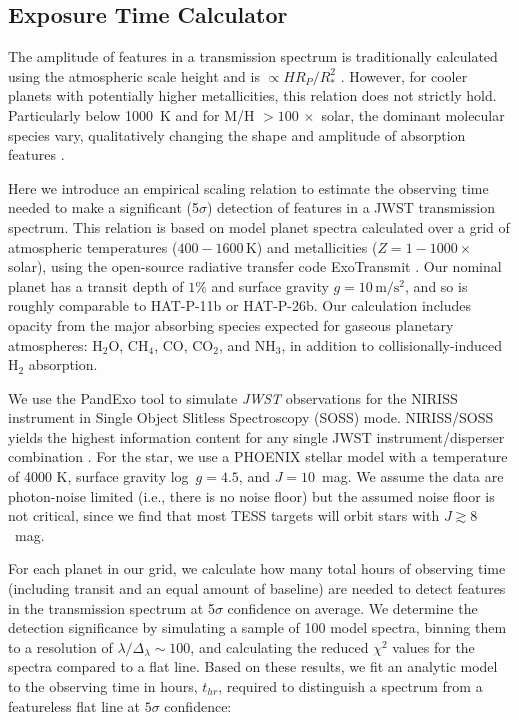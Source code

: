 \documentclass[twocolumn]{aastex61}
\begin{document}
\subsection{Exposure Time Calculator}
The amplitude of features in a transmission spectrum is traditionally calculated using the atmospheric scale height and is $\propto H R_P/R_*^2$ \citep{miller-ricci:2009}. However, for cooler planets with potentially higher metallicities, this relation does not strictly hold. Particularly below 1000~K and for M/H  $>100\,\times$ solar, the dominant molecular species vary,  qualitatively changing the shape and amplitude of absorption features \citep{moses:2013}.

Here we introduce an empirical scaling relation to estimate the
observing time needed to make a significant (5$\sigma$) detection of
features in a JWST transmission spectrum. This relation is based on
model planet spectra calculated over a grid of atmospheric
temperatures ($400 - 1600\,\mathrm{K}$) and metallicities ($Z = 1 -
1000\times$ solar), using the open-source radiative transfer code
ExoTransmit \citep{kempton:2016}.  Our nominal planet has a transit
depth of $1\%$ and surface gravity $g = 10\,\mathrm{m/s^2}$, and so is
roughly comparable to HAT-P-11b or HAT-P-26b. Our calculation includes
opacity from the major absorbing species expected for gaseous
planetary atmospheres: H$_2$O, CH$_4$, CO, CO$_2$, and NH$_3$, in
addition to collisionally-induced H$_2$ absorption.

We use the PandExo tool \citep{batalha:2017b} to simulate {\em JWST} observations for the NIRISS instrument in Single Object Slitless Spectroscopy (SOSS) mode. NIRISS/SOSS yields the highest information content for any single JWST instrument/disperser combination \citep{batalha:2017a}.  For the star, we use a PHOENIX stellar model with a temperature of 4000 K, surface gravity log~$g = 4.5$, and  $J = 10$~mag. We assume the data are photon-noise limited (i.e., there is no noise floor) but the assumed noise floor is not critical, since we find that most TESS targets will orbit stars with $J\gtrsim8$~mag.

For each planet in our grid, we calculate how many total hours of observing time (including transit and an equal amount of baseline) are needed to detect features in the transmission spectrum at 5$\sigma$ confidence on average. We determine the detection significance by simulating a sample of 100 model spectra, binning them to a resolution of $\lambda/\Delta_\lambda \sim 100$, and calculating the reduced $\chi^2$ values for the spectra compared to a flat line.  Based on these results, we fit an analytic model to the observing time in hours, $t_{hr}$,  required to distinguish a spectrum from a featureless flat line at $5\sigma$ confidence:
\end{document}
